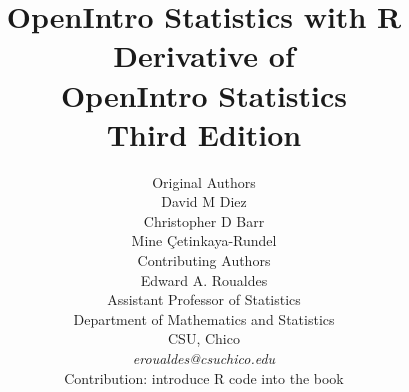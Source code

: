 

\title{\huge OpenIntro Statistics with R \\[2mm]
\large Derivative of \\
OpenIntro Statistics \\
Third Edition}
\author{\Large Original Authors \\[1.5mm]
\normalsize David M Diez \\
\normalsize Christopher D Barr \\
\normalsize Mine \c{C}etinkaya-Rundel \\[8mm]
\Large Contributing Authors \\[1.5mm]
\normalsize Edward A. Roualdes \\
\small Assistant Professor of Statistics \\
\small Department of Mathematics and Statistics \\
\small CSU, Chico \\
\small \emph{eroualdes@csuchico.edu} \\
\small Contribution: introduce R code into the book \\
}

